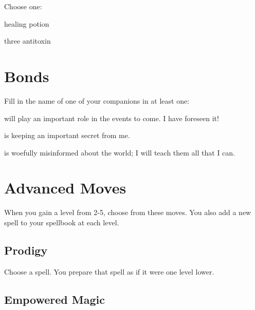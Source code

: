 Choose one:

         
\startitemize[1,packed]
           
\item healing potion

           
\item three antitoxin

         
\stopitemize
       

       
\section{Bonds}   
       

         

Fill in the name of one of your companions in at least one:

         

\thinrules[n=2] will play an important role in the events to come. I have foreseen it!

         

\thinrules[n=2] is keeping an important secret from me.

         

\thinrules[n=2] is woefully misinformed about the world; I will teach them all that I can.

       

       
\section{Advanced Moves}    
       

         
\startInstructionsAfterHeader
When you gain a level from 2-5, choose from these moves. You also add a new spell to your spellbook at each level.
\stopInstructionsAfterHeader
         
\subsection{Prodigy}   
         

Choose a spell. You prepare that spell as if it were one level lower.

         
\subsection{Empowered Magic}    
         


